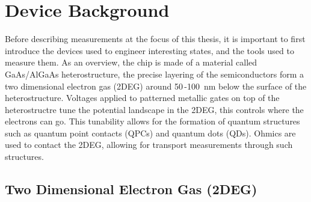 \chapter{Device Background}\label{cha:device_background}

Before describing measurements at the focus of this thesis, it is important to first introduce the devices used to engineer interesting states, and the tools used to measure them. As an overview, the chip is made of a material called GaAs/AlGaAs heterostructure, the precise layering of the semiconductors form a two dimensional electron gas (2DEG) around 50\,-\qty{100}{nm} below the surface of the heterostructure. Voltages applied to patterned metallic gates on top of the heterostructre tune the potential landscape in the 2DEG, this controls where the electrons can go. This tunability allows for the formation of quantum structures such as quantum point contacts (QPCs) and quantum dots (QDs). Ohmics are used to contact the 2DEG, allowing for transport measurements through such structures. 



\section{Two Dimensional Electron Gas (2DEG)}



